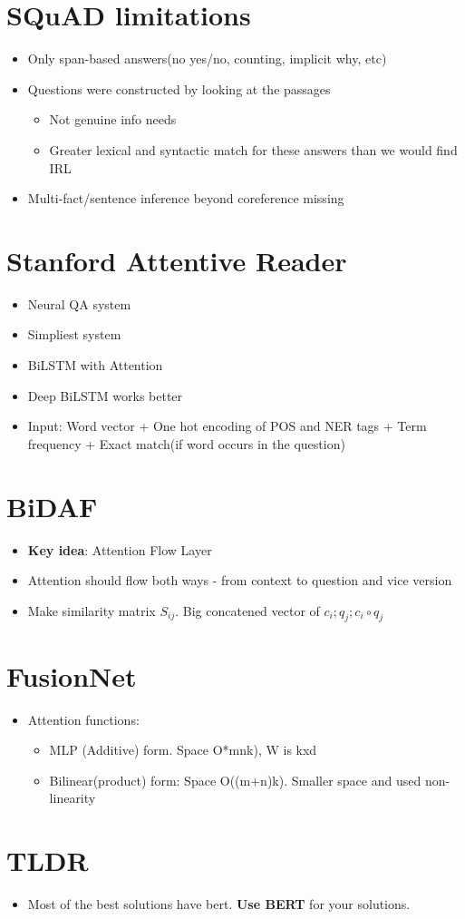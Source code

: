 \documentclass[a4paper]{article}
\begin{document}
\section{SQuAD limitations}
\begin{itemize}
    \item Only span-based answers(no yes/no, counting, implicit why, etc)
    \item Questions were constructed by looking at the passages
    \begin{itemize}
        \item Not genuine info needs
        \item Greater lexical and syntactic match for these answers than we would find IRL
    \end{itemize}
    \item Multi-fact/sentence inference beyond coreference missing
\end{itemize}
\section{Stanford Attentive Reader}
\begin{itemize}
    \item Neural QA system
    \item Simpliest system
    \item BiLSTM with Attention
    \item Deep BiLSTM works better
    \item Input: Word vector + One hot encoding of POS and NER tags + Term frequency + Exact match(if word occurs in the question)
\end{itemize}
\section{BiDAF}
\begin{itemize}
    \item \textbf{Key idea}: Attention Flow Layer
    \item Attention should flow both ways - from context to question and vice version
    \item Make similarity matrix $S_{ij}$. Big concatened vector of   $c_i;q_j;c_i \circ q_j$
\end{itemize}
\section{FusionNet}
\begin{itemize}
    \item Attention functions:
    \begin{itemize}
        \item MLP (Additive) form. Space O*mnk), W is kxd
        \item Bilinear(product) form: Space O((m+n)k). Smaller space and used non-linearity
    \end{itemize}
\end{itemize}
\section{TLDR}
\begin{itemize}
    \item Most  of the best solutions have bert. \textbf{Use BERT} for your solutions. 
\end{itemize}
\end{document}
